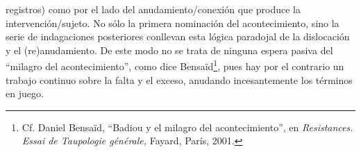 registros) como por el lado del anudamiento/conexión que produce la intervención/sujeto. No sólo la primera nominación del acontecimiento, sino la serie de indagaciones posteriores conllevan esta lógica paradojal de la dislocación y el (re)anudamiento. De este modo no se trata de ninguna espera pasiva del \enquote{milagro del acontecimiento}, como dice Bensaïd\footnote{Cf. Daniel Bensaïd, \enquote{Badiou y el milagro del acontecimiento}, en \emph{Resistances. Essai de Taupologie générale,} Fayard, París, 2001.}, pues hay por el contrario un trabajo continuo sobre la falta y el exceso, anudando incesantemente los términos en juego.
%
%
%
